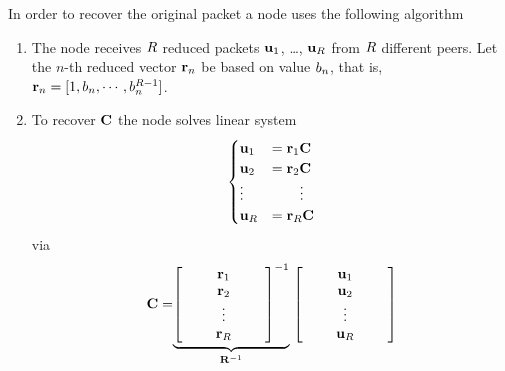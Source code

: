 \documentclass{medusabook}
\begin{document}
%
In order to recover the original packet a node uses the following
algorithm
\begin{enumerate}
\item
The node receives $R$ reduced packets ${\mathbf u}_1$, \ldots,
${\mathbf u}_R$ from $R$ different peers.  Let the $n$-th reduced
vector ${\mathbf r}_n$ be based on value $b_n$, that is, 
${\mathbf r}_n = [1, b_n, \cdots, b_n^{R-1}]$.
\item
To recover ${\mathbf C}$ the node solves linear system
%
\begin{equation}
\label{eq:3;medusa_book}
\begin{cases}
  {\mathbf u}_1 &= {\mathbf r}_1 {\mathbf C}\\
  {\mathbf u}_2 &= {\mathbf r}_2 {\mathbf C}\\
  \vdots &\qquad \vdots\\
  {\mathbf u}_R &= {\mathbf r}_R {\mathbf C}
\end{cases}
\end{equation}
%
via
%
\begin{equation}
\label{eq:4;medusa_book}
{\mathbf C} 
=
\mathrel{\mathop{\underbrace{\left[ 
  \begin{array}{c}
    \qquad {\mathbf r}_1 \qquad \\
     {\mathbf r}_2  \\
    \vdots\\
     {\mathbf r}_R  \\
  \end{array}
\right]^{-1}}}\limits_{{\mathbf R}^{-1}}}
\left[ 
  \begin{array}{c}
    \qquad {\mathbf u}_1 \qquad \\
     {\mathbf u}_2  \\
    \vdots\\
     {\mathbf u}_R  \\
  \end{array}
\right]
\end{equation}
\end{enumerate}
\end{document}
